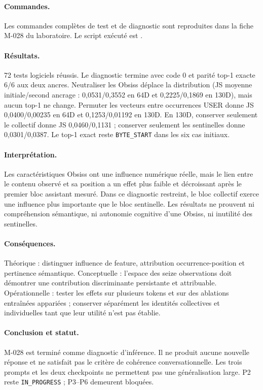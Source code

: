\documentclass[11pt,a4paper]{report}
\begin{document}
\paragraph{Commandes.} Les commandes complètes de test et de diagnostic sont reproduites dans la fiche M-028 du laboratoire. Le script exécuté est .
\paragraph{Résultats.} 72 tests logiciels réussis. Le diagnostic termine avec code 0 et parité top-1 exacte 6/6 aux deux ancres. Neutraliser les Obsiss déplace la distribution (JS moyenne initiale/second ancrage : 0,0531/0,3552 en 64D et 0,2225/0,1869 en 130D), mais aucun top-1 ne change. Permuter les vecteurs entre occurrences USER donne JS 0,0400/0,00235 en 64D et 0,1253/0,01192 en 130D. En 130D, conserver seulement le collectif donne JS 0,0460/0,1131 ; conserver seulement les sentinelles donne 0,0301/0,0387. Le top-1 exact reste \texttt{BYTE\_START} dans les six cas initiaux.
\paragraph{Interprétation.} Les caractéristiques Obsiss ont une influence numérique réelle, mais le lien entre le contenu observé et sa position a un effet plus faible et décroissant après le premier bloc assistant mesuré. Dans ce diagnostic restreint, le bloc collectif exerce une influence plus importante que le bloc sentinelle. Les résultats ne prouvent ni compréhension sémantique, ni autonomie cognitive d'une Obsiss, ni inutilité des sentinelles.
\paragraph{Conséquences.} Théorique : distinguer influence de feature, attribution occurrence-position et pertinence sémantique. Conceptuelle : l'espace des seize observations doit démontrer une contribution discriminante persistante et attribuable. Opérationnelle : tester les effets sur plusieurs tokens et sur des ablations entraînées appariées ; conserver séparément les identités collectives et individuelles tant que leur utilité n'est pas établie.
\paragraph{Conclusion et statut.} M-028 est terminé comme diagnostic d'inférence. Il ne produit aucune nouvelle réponse et ne satisfait pas le critère de cohérence conversationnelle. Les trois prompts et les deux checkpoints ne permettent pas une généralisation large. P2 reste \texttt{IN\_PROGRESS} ; P3--P6 demeurent bloquées.
\end{document}
